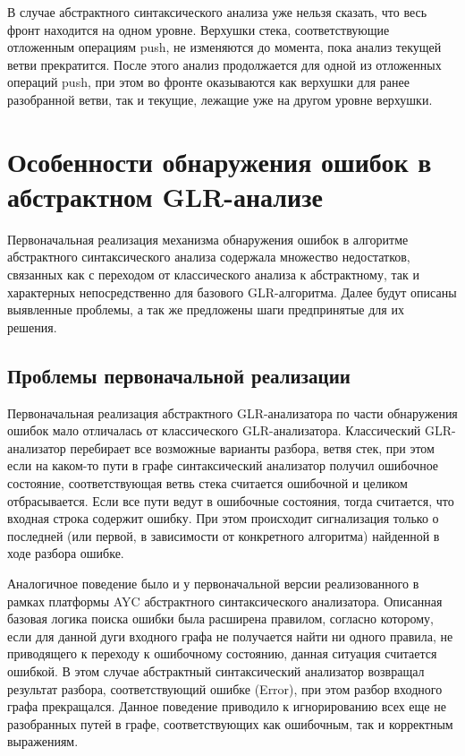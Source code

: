 В случае абстрактного синтаксического анализа уже нельзя сказать, что весь фронт 
находится на одном уровне. Верхушки стека, соответствующие отложенным операциям 
push, не изменяются до момента, пока анализ текущей ветви прекратится. После этого 
анализ продолжается для одной из отложенных операций push, при этом во фронте 
оказываются как верхушки для ранее разобранной ветви, так и текущие, лежащие уже 
на другом уровне верхушки.


\section{Особенности обнаружения ошибок в абстрактном GLR-анализе}
Первоначальная реализация механизма обнаружения ошибок в алгоритме абстрактного 
синтаксического анализа содержала множество недостатков, связанных как с переходом 
от классического анализа к абстрактному, так и характерных непосредственно для 
базового GLR-алгоритма. Далее будут описаны выявленные проблемы, а так же предложены 
шаги предпринятые для их решения.

\subsection{Проблемы первоначальной реализации}
Первоначальная реализация абстрактного GLR-анализатора по части обнаружения ошибок 
мало отличалась от классического GLR-анализатора. Классический GLR-анализатор 
перебирает все возможные варианты разбора, ветвя стек, при этом если на каком-то 
пути в графе синтаксический анализатор получил ошибочное  состояние, соответствующая 
ветвь стека считается ошибочной и целиком отбрасывается. Если все пути ведут в 
ошибочные состояния, тогда считается, что входная строка содержит ошибку. При этом 
происходит сигнализация только о последней (или первой, в зависимости от конкретного 
алгоритма) найденной в ходе разбора ошибке. 

Аналогичное поведение было и у первоначальной версии реализованного в рамках 
платформы AYC абстрактного синтаксического анализатора. Описанная базовая логика 
поиска ошибки была расширена правилом, согласно которому, если для данной дуги 
входного графа не получается найти ни одного правила, не приводящего к переходу 
к ошибочному состоянию, данная ситуация считается ошибкой. В этом случае абстрактный 
синтаксический анализатор возвращал результат разбора, соответствующий ошибке 
(Error), при этом разбор входного графа прекращался. Данное поведение приводило 
к игнорированию всех еще не разобранных путей в графе, соответствующих как ошибочным, 
так и корректным выражениям. 

